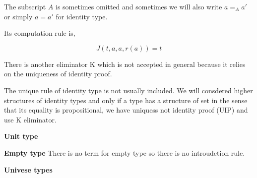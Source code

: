 The subscript $A$ is sometimes omitted and sometimes we will also write $a =_{A} a'$ or simply $a = a'$ for identity type.


Its computation rule is,

$$J(t,a,a,r(a)) = t$$


There is another eliminator K which is not accepted in general because it relies on the uniqueness of identity proof.



The unique rule of identity type is not usually included. We will consdered higher structures of identity types and only if a type has a structure of set in the sense that its equality is propositional, we have uniquess not identity proof (UIP) and use K eliminator.

\textbf{Unit type}


\begin{multicols}{2}
\columnbreak
{}
\end{multicols}



\textbf{Empty type}
There is no term for empty type so there is no introudction rule.


\begin{multicols}{2}

\columnbreak


\end{multicols}

\textbf{Univese types}


\begin{multicols}{2}



\columnbreak


\end{multicols}

